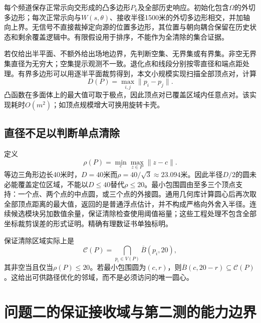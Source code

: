 \documentclass[UTF8,a4paper,zihao=-4,fontset=mac]{ctexart}
\begin{document}
每个频道保存正常示向交形成的凸多边形$P_k$及全部历史响应。初始化包含$\Omega$的外切多边形；每次正常示向与$W(s,\theta)$、接收半径1500米的外切多边形相交，并加轴向上界。无信号不直接裁掉定向源的位置多边形，其位置与朝向耦合保留在历史状态和剩余覆盖逻辑中。有限假设用于排序，不能作为全清除的集合证据。

若仅给出半平面、不额外给出场地边界，先判断空集、无界集或有界集。非空无界集直径为无穷大；空集提示观测不一致。退化点和线段分别按零直径和端点距处理。有界多边形可以用逐半平面裁剪得到，本文小规模实现扫描全部顶点对，计算
\begin{equation}D(P)=\max_{i,j}\|p_i-p_j\|.\end{equation}
凸函数在多面体上的最大值可取于极点，因此顶点对已覆盖区域内任意点对。该实现耗时$O(m^2)$；如顶点规模增大可换用旋转卡壳。

\subsection{直径不足以判断单点清除}
定义
\begin{equation}\rho(P)=\min_c\max_{z\in P}\|z-c\|.\end{equation}
等边三角形边长40米时，$D=40$米而$\rho=40/\sqrt3\approx23.094$米。因此半径$D/2$的圆未必能覆盖定位区域，不能以$D\le40$替代$\rho\le20$。最小包围圆由至多三个顶点支持：一个点、两个点的中点圆，或三个点的外接圆。通用几何库计算圆心后再次取全部顶点距离的最大值，返回的是普通浮点估计，并不构成严格向外舍入半径。连续候选模块另加数值余量，保证清除检查使用阈值裕量；这些工程处理不包含全部坐标裁剪误差的形式证明。精确有理数证书单独标明。

保证清除区域实际上是
\begin{equation}\label{eq:clearset}\mathcal C(P)=\bigcap_{p_i\in V(P)}\overline B(p_i,20),\end{equation}
其非空当且仅当$\rho(P)\le20$。若最小包围圆为$(c,r)$，则$\overline B(c,20-r)\subseteq\mathcal C(P)$。这给出可供路径优化的邻域，而不是必须访问的唯一圆心。

\section{问题二的保证接收域与第二测的能力边界}
\end{document}
